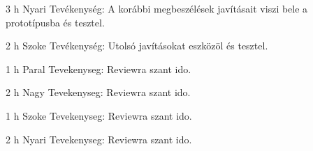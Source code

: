 \begin{naplo}
            {3 h}
            {Nyari}
            {Tevékenység: A korábbi megbeszélések javításait viszi bele a prototípusba és tesztel.}

            {2 h}
            {Szoke}
            {Tevékenység: Utolsó javításokat eszközöl és tesztel.}

            {1 h}
            {Paral}
            {Tevekenyseg: Reviewra szant ido.}

            {2 h}
            {Nagy}
            {Tevekenyseg: Reviewra szant ido.}

            {1 h}
            {Szoke}
            {Tevekenyseg: Reviewra szant ido.}

            {2 h}
            {Nyari}
            {Tevekenyseg: Reviewra szant ido.}
\end{naplo}
